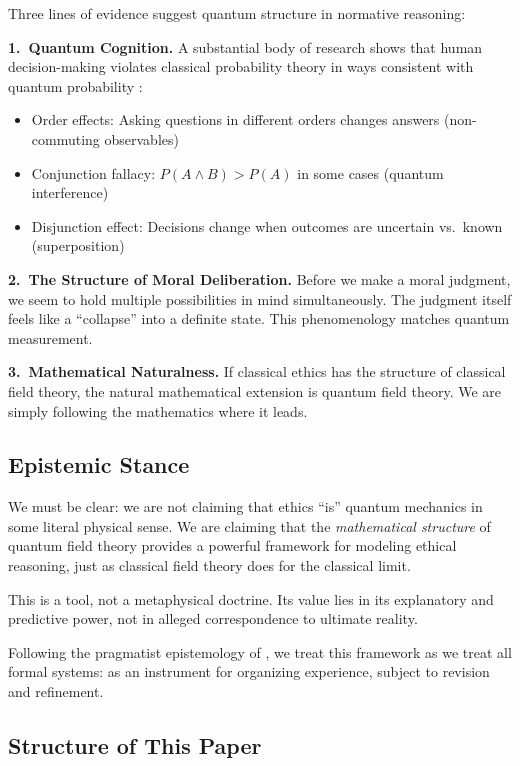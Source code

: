 \documentclass[12pt]{article}
\begin{document}
Three lines of evidence suggest quantum structure in normative reasoning:

\textbf{1.\ Quantum Cognition.} A substantial body of research shows that human decision-making violates classical probability theory in ways consistent with quantum probability \cite{busemeyer2012,pothos2013,bruza2015}:

\begin{itemize}
    \item Order effects: Asking questions in different orders changes answers (non-commuting observables)
    \item Conjunction fallacy: $P(A \wedge B) > P(A)$ in some cases (quantum interference)
    \item Disjunction effect: Decisions change when outcomes are uncertain vs.\ known (superposition)
\end{itemize}

\textbf{2.\ The Structure of Moral Deliberation.} Before we make a moral judgment, we seem to hold multiple possibilities in mind simultaneously. The judgment itself feels like a ``collapse'' into a definite state. This phenomenology matches quantum measurement.

\textbf{3.\ Mathematical Naturalness.} If classical ethics has the structure of classical field theory, the natural mathematical extension is quantum field theory. We are simply following the mathematics where it leads.

\subsection{Epistemic Stance}

We must be clear: we are not claiming that ethics ``is'' quantum mechanics in some literal physical sense. We are claiming that the \emph{mathematical structure} of quantum field theory provides a powerful framework for modeling ethical reasoning, just as classical field theory does for the classical limit.

This is a tool, not a metaphysical doctrine. Its value lies in its explanatory and predictive power, not in alleged correspondence to ultimate reality.

Following the pragmatist epistemology of \cite{bond2025pragmatist}, we treat this framework as we treat all formal systems: as an instrument for organizing experience, subject to revision and refinement.

\subsection{Structure of This Paper}
\end{document}
